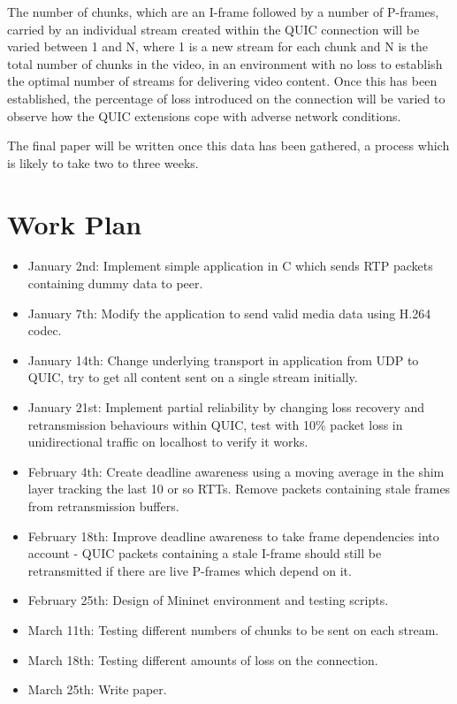 \documentclass{mprop}
\begin{document}
The number of chunks, which are an I-frame followed by a number of P-frames, carried by an individual stream created within the QUIC connection will be varied between 1 and N, where 1 is a new stream for each chunk and N is the total number of chunks in the video, in an environment with no loss to establish the optimal number of streams for delivering video content. Once this has been established, the percentage of loss introduced on the connection will be varied to observe how the QUIC extensions cope with adverse network conditions.

The final paper will be written once this data has been gathered, a process which is likely to take two to three weeks.

\newpage

\section{Work Plan}


\begin{itemize}
  \item January 2nd: Implement simple application in C which sends RTP packets containing dummy 
  data to peer.
  \item January 7th: Modify the application to send valid media data using H.264 codec.
  \item January 14th: Change underlying transport in application from UDP to QUIC, try to get all 
  content sent on a single stream initially.
  \item January 21st: Implement partial reliability by changing loss recovery and retransmission 
  behaviours within QUIC, test with 10\% packet loss in unidirectional traffic on localhost to 
  verify it works.
  \item February 4th: Create deadline awareness using a moving average in the shim layer tracking 
  the last 10 or so RTTs. Remove packets containing stale frames from retransmission buffers.
  \item February 18th: Improve deadline awareness to take frame dependencies into account - QUIC 
  packets containing a stale I-frame should still be retransmitted if there are live P-frames 
  which depend on it.
  \item February 25th: Design of Mininet environment and testing scripts.
  \item March 11th: Testing different numbers of chunks to be sent on each stream.
  \item March 18th: Testing different amounts of loss on the connection.
  \item March 25th: Write paper.
\end{itemize}
\end{document}
